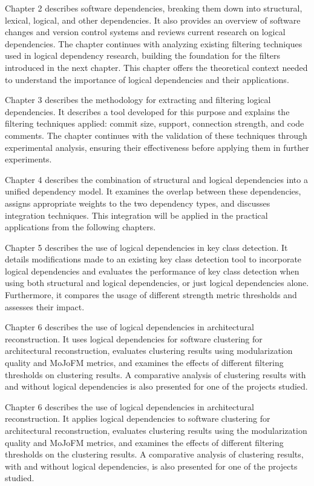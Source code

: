 Chapter 2 describes software dependencies, breaking them down into structural, lexical, logical, and other dependencies. It also provides an overview of software changes and version control systems and reviews current research on logical dependencies. The chapter continues with analyzing existing filtering techniques used in logical dependency research, building the foundation for the filters introduced in the next chapter. This chapter offers the theoretical context needed to understand the importance of logical dependencies and their applications.

Chapter 3 describes the methodology for extracting and filtering logical dependencies. It describes a tool developed for this purpose and explains the filtering techniques applied: commit size, support, connection strength, and code comments. The chapter continues with the validation of these techniques through experimental analysis, ensuring their effectiveness before applying them in further experiments.

Chapter 4 describes the combination of structural and logical dependencies into a unified dependency model. It examines the overlap between these dependencies, assigns appropriate weights to the two dependency types, and discusses integration techniques. This integration will be applied in the practical applications from the following chapters.

Chapter 5 describes the use of logical dependencies in key class detection. It details modifications made to an existing key class detection tool to incorporate logical dependencies and evaluates the performance of key class detection when using both structural and logical dependencies, or just logical dependencies alone. Furthermore, it compares the usage of different strength metric thresholds and assesses their impact.

Chapter 6 describes the use of logical dependencies in architectural reconstruction. It uses logical dependencies for software clustering for architectural reconstruction, evaluates clustering results using modularization quality and MoJoFM metrics, and examines the effects of different filtering thresholds on clustering results. A comparative analysis of clustering results with and without logical dependencies is also presented for one of the projects studied.


Chapter 6 describes the use of logical dependencies in architectural reconstruction. It applies logical dependencies to software clustering for architectural reconstruction, evaluates clustering results using the modularization quality and MoJoFM metrics, and examines the effects of different filtering thresholds on the clustering results. A comparative analysis of clustering results, with and without logical dependencies, is also presented for one of the projects studied.

